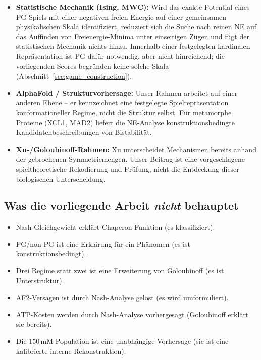 \documentclass[12pt,a4paper]{article}
\begin{document}
\begin{itemize}
  \item \textbf{Statistische Mechanik (Ising, MWC):} Wird das exakte
    Potential eines PG-Spiels mit einer negativen freien Energie auf einer
    gemeinsamen physikalischen Skala identifiziert, reduziert sich die
    Suche nach reinen NE auf das Auffinden von Freienergie-Minima unter
    einseitigen Zügen und fügt der statistischen Mechanik nichts hinzu.
    Innerhalb einer festgelegten kardinalen Repräsentation ist PG dafür
    notwendig, aber nicht hinreichend; die vorliegenden Scores begründen
    keine solche Skala (Abschnitt~\ref{sec:game_construction}).

  \item \textbf{AlphaFold / Strukturvorhersage:} Unser Rahmen arbeitet
    auf einer anderen Ebene -- er kennzeichnet eine festgelegte Spielrepräsentation
    konformationeller Regime, nicht die Struktur selbst. Für metamorphe
    Proteine (XCL1, MAD2) liefert die NE-Analyse
    konstruktionsbedingte Kandidatenbeschreibungen von Bistabilität.

  \item \textbf{Xu-/Goloubinoff-Rahmen:} Xu unterscheidet Mechanismen
    bereits anhand der gebrochenen Symmetriemengen. Unser Beitrag ist
    eine vorgeschlagene spieltheoretische Rekodierung und Prüfung, nicht
    die Entdeckung dieser biologischen Unterscheidung.
\end{itemize}

\subsection{Was die vorliegende Arbeit \emph{nicht} behauptet}

\begin{itemize}
  \item Nash-Gleichgewicht \glqq erklärt\grqq{} Chaperon-Funktion (es
    klassifiziert).
  \item PG/non-PG ist eine \glqq Erklärung\grqq{} für ein Phänomen (es ist
    konstruktionsbedingt).
  \item \glqq Drei Regime statt zwei\grqq{} ist eine Erweiterung von Goloubinoff
    (es ist Unterstruktur).
  \item AF2-Versagen ist durch Nash-Analyse \glqq gelöst\grqq{} (es wird
    umformuliert).
  \item ATP-Kosten werden durch Nash-Analyse \glqq vorhergesagt\grqq{}
    (Goloubinoff erklärt sie bereits).
  \item Die $150$\,mM-Population ist eine unabhängige Vorhersage (sie ist
    eine kalibrierte interne Rekonstruktion).
\end{itemize}
\end{document}

